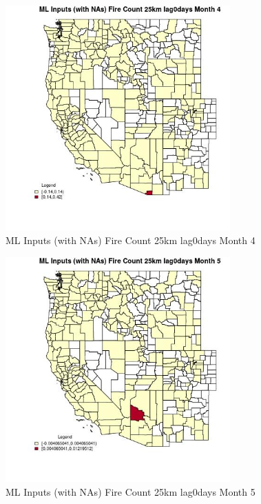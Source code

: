 \begin{figure} 
\centering  
\includegraphics[width=0.77\textwidth]{Code_Outputs/Report_ML_input_PM25_Step4_part_e_de_duplicated_aves_compiled_2019-05-21wNAs_CountyFire_Count_25km_lag0daysmedianMonth4.jpg} 
\caption{\label{fig:Report_ML_input_PM25_Step4_part_e_de_duplicated_aves_compiled_2019-05-21wNAsCountyFire_Count_25km_lag0daysmedianMonth4}ML Inputs (with NAs) Fire Count 25km lag0days Month 4} 
\end{figure} 
 

\begin{figure} 
\centering  
\includegraphics[width=0.77\textwidth]{Code_Outputs/Report_ML_input_PM25_Step4_part_e_de_duplicated_aves_compiled_2019-05-21wNAs_CountyFire_Count_25km_lag0daysmedianMonth5.jpg} 
\caption{\label{fig:Report_ML_input_PM25_Step4_part_e_de_duplicated_aves_compiled_2019-05-21wNAsCountyFire_Count_25km_lag0daysmedianMonth5}ML Inputs (with NAs) Fire Count 25km lag0days Month 5} 
\end{figure} 
 

